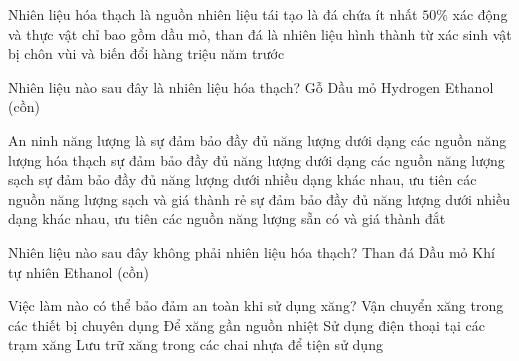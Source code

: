 \documentclass[Main.tex]{subfiles}
\begin{document}
\begin{ex}%
	Nhiên liệu hóa thạch
	\choice
	{là nguồn nhiên liệu tái tạo}
	{là đá chứa ít nhất $50\%$ xác động và thực vật}
	{chỉ bao gồm dầu mỏ, than đá}
	{\True là nhiên liệu hình thành từ xác sinh vật bị chôn vùi và biến đổi hàng triệu năm trước}
\end{ex}

\begin{ex}%
	Nhiên liệu nào sau đây là nhiên liệu hóa thạch?
	\choice
	{Gỗ}
	{\True Dầu mỏ}
	{Hydrogen}
	{Ethanol (cồn)}
\end{ex}

\begin{ex}%
	An ninh năng lượng là
	\choice
	{sự đảm bảo đầy đủ năng lượng dưới dạng các nguồn năng lượng hóa thạch}
	{sự đảm bảo đầy đủ năng lượng dưới dạng các nguồn năng lượng sạch}
	{\True sự đảm bảo đầy đủ năng lượng dưới nhiều dạng khác nhau, ưu tiên các nguồn năng lượng sạch và giá thành rẻ}
	{sự đảm bảo đầy đủ năng lượng dưới nhiều dạng khác nhau, ưu tiên các nguồn năng lượng sẵn có và giá thành đắt}
\end{ex}

\begin{ex}%
	Nhiên liệu nào sau đây không phải nhiên liệu hóa thạch?
	\choice
	{Than đá}
	{Dầu mỏ}
	{Khí tự nhiên}
	{\True Ethanol (cồn)}
\end{ex}

\begin{ex}%
	Việc làm nào có thể bảo đảm an toàn khi sử dụng xăng?
	\choice
	{\True Vận chuyển xăng trong các thiết bị chuyên dụng}
	{Để xăng gần nguồn nhiệt}
	{Sử dụng điện thoại tại các trạm xăng}
	{Lưu trữ xăng trong các chai nhựa để tiện sử dụng}
\end{ex}
\end{document}
